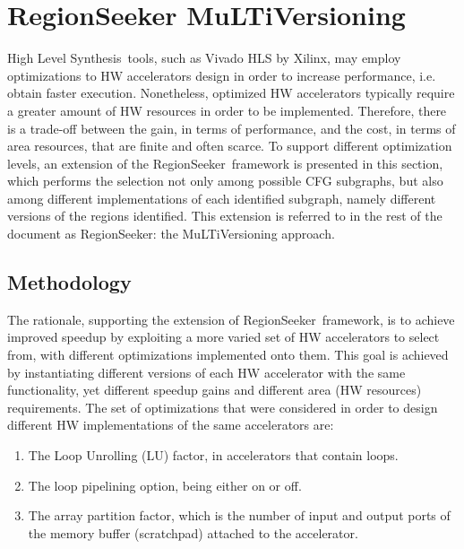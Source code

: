 \documentclass[]{usiinfthesis}
\newcommand{\rseeker}{{RegionSeeker}}
\newcommand{\HLS}{{High Level Synthesis}}
\begin{document}
\newpage
%
%
%
%
%
%
\section{RegionSeeker MuLTiVersioning}
\label{sec:multi}

\HLS\ tools, such as Vivado HLS by Xilinx, may employ %
optimizations to HW accelerators
design in order to increase performance, i.e. obtain faster execution. 
Nonetheless, optimized HW accelerators typically require a greater amount of HW resources
in order to be implemented. Therefore, there is a trade-off between the gain, in 
terms of performance, and the cost, in terms of area resources, that are finite
and often scarce.
To support different optimization levels, an extension of the \rseeker\ framework 
is presented in this section, which performs the selection not 
only among possible CFG subgraphs, but also among different implementations of each identified 
subgraph, namely different versions of the regions identified. 
This extension is referred to in the rest of the document as RegionSeeker: the 
MuLTiVersioning approach.

\subsection{Methodology}
\label{subsec:mv_meth}

The rationale, supporting the extension of \rseeker\ framework, is to achieve improved
speedup by exploiting a more varied set of HW accelerators to select from, 
with different optimizations implemented onto them. This goal is achieved by instantiating 
different versions of each HW accelerator with the same functionality, yet different speedup gains 
and different area (HW resources) requirements. The set of optimizations that were considered in 
order to design different HW implementations of the same accelerators are: 
\begin{enumerate}
\item The Loop Unrolling 
(LU) factor, in accelerators that contain loops.
\item The loop pipelining option, being either on or off.
\item The array partition factor, 
which is the number of input and output ports of the memory buffer (scratchpad) attached 
to the accelerator.
\end{enumerate}\par
\end{document}
